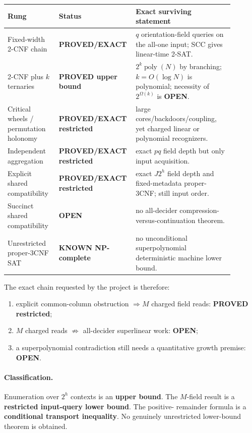 \documentclass[11pt]{article}
\begin{document}
\begin{center}
\begin{tabular}{p{0.22\linewidth}p{0.25\linewidth}p{0.42\linewidth}}
\toprule
Rung & Status & Exact surviving statement \\
\midrule
Fixed-width 2-CNF chain & \textbf{PROVED/EXACT} & $q$ orientation-field
queries on the all-one input; SCC gives linear-time 2-SAT.\\
2-CNF plus $k$ ternaries & \textbf{PROVED upper bound} &
$2^k\operatorname{poly}(N)$ by branching; $k=O(\log N)$ is polynomial;
necessity of $2^{\Omega(k)}$ is \textbf{OPEN}.\\
Critical wheels / permutation holonomy & \textbf{PROVED/EXACT restricted} &
large cores/backdoors/coupling, yet charged linear or polynomial
recognizers.\\
Independent aggregation & \textbf{PROVED/EXACT restricted} & exact $pq$
field depth but only input acquisition.\\
Explicit shared compatibility & \textbf{PROVED/EXACT restricted} & exact
$J2^h$ field depth and fixed-metadata proper-3CNF; still input order.\\
Succinct shared compatibility & \textbf{OPEN} & no all-decider
compression-versus-continuation theorem.\\
Unrestricted proper-3CNF SAT & \textbf{KNOWN NP-complete} & no unconditional
superpolynomial deterministic machine lower bound.\\
\bottomrule
\end{tabular}
\end{center}

The exact chain requested by the project is therefore:
\begin{enumerate}
\item explicit common-column obstruction $\Longrightarrow M$ charged field
reads: \textbf{PROVED restricted};
\item $M$ charged reads $\not\Longrightarrow$ all-decider superlinear work:
\textbf{OPEN};
\item a superpolynomial contradiction still needs a quantitative growth
premise: \textbf{OPEN}.
\end{enumerate}

\paragraph{Classification.}
Enumeration over $2^h$ contexts is an \textbf{upper bound}.  The $M$-field
result is a \textbf{restricted input-query lower bound}.  The positive-
remainder formula is a \textbf{conditional transport inequality}.  No
genuinely unrestricted lower-bound theorem is obtained.
\end{document}
